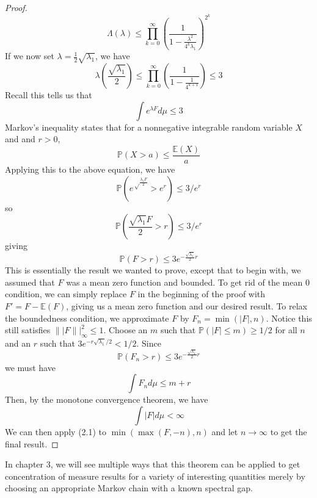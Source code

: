 \documentclass[12pt]{report}
\theoremstyle{definition}
\begin{document}
\begin{proof}
$$
\Lambda(\lambda)\leq \prod_{k=0}^{\infty} \left(\frac{1}{1-\frac{\lambda^2}{4^k\lambda_1}}\right)^{2^k}
$$
If we now set $\lambda=\frac{1}{2}\sqrt{\lambda_1}$, we have 
$$
\lambda\left(\frac{\sqrt{\lambda_1}}{2}\right)\leq \prod_{k=0}^{\infty}\left(\frac{1}{1-\frac{1}{4^{k+1}}}\right)\leq 3
$$
Recall this tells us that 
$$
\int e^{\lambda F}d\mu\leq 3 
$$
Markov's inequality states that for a nonnegative integrable random variable $X$ and and $r>0$, 
$$
\mathbb{P}(X>a)\leq \frac{\mathbb{E}(X)}{a}
$$
Applying this to the above equation, we have 
$$
\mathbb{P}(e^{\sqrt\frac{\lambda_1F}{2}}>e^r)\leq 3/e^r
$$
so 
$$
\mathbb{P}(\frac{\sqrt{\lambda_1}F}{2}> r)\leq 3/e^r
$$
giving 
\begin{equation}
\mathbb{P}(F>r)\leq 3e^{-\frac{\sqrt{\lambda_1}}{2}r}
\end{equation}
This is essentially the result we wanted to prove, except that to begin with, we assumed that $F$ was a mean zero function and bounded.  To get rid of the mean $0$ condition, we can simply replace $F$ in the beginning of the proof with $F'=F-\mathbb{E}(F)$, giving us a mean zero function and our desired result.  To relax the boundedness condition, we approximate $F$ by $F_n=\min(|F|, n)$.  Notice this still satisfies $\||F\||_{\infty}^2\leq 1$. 
Choose an $m$ such that $\mathbb{P}(|F|\leq m)\geq 1/2$ for all $n$ and an $r$ such that $3e^{-r\sqrt{\lambda_1}/2}<1/2$.  Since 
$$
\mathbb{P}(F_n>r)\leq 3e^{-\frac{\sqrt{\lambda_1}}{2}r}
$$
 we must have 
$$
\int F_n d\mu\leq m+r
$$
Then, by the monotone convergence theorem, we have
$$
\int |F|d\mu <\infty
$$
We can then apply (2.1) to $\min(\max(F,-n),n)$ and let $n\rightarrow\infty$ to get the final result.  

\end{proof}
In chapter 3, we will see multiple ways that this theorem can be applied to get concentration of measure results for a variety of interesting quantities merely by choosing an appropriate Markov chain with a known spectral gap.  
\end{document}
